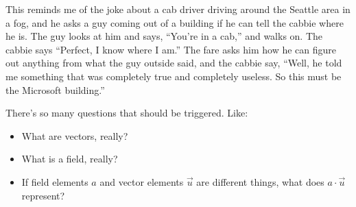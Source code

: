 \documentclass[
]{book}
\providecommand{\tightlist}{%
  \setlength{\itemsep}{0pt}\setlength{\parskip}{0pt}}
\begin{document}
This reminds me of the joke about a cab driver driving around the Seattle area in a fog, and he asks a guy coming out of a building if he can tell the cabbie where he is. The guy looks at him and says, ``You're in a cab,'' and walks on. The cabbie says ``Perfect, I know where I am.'' The fare asks him how he can figure out anything from what the guy outside said, and the cabbie say, ``Well, he told me something that was completely true and completely useless. So this must be the Microsoft building.''

There's so many questions that should be triggered. Like:

\begin{itemize}
\tightlist
\item
  What are vectors, really?
\item
  What is a field, really?
\item
  If field elements \(a\) and vector elements \(\vec{u}\) are different things, what does \(a \cdot \vec{u}\) represent?
\end{itemize}

  
\end{document}
